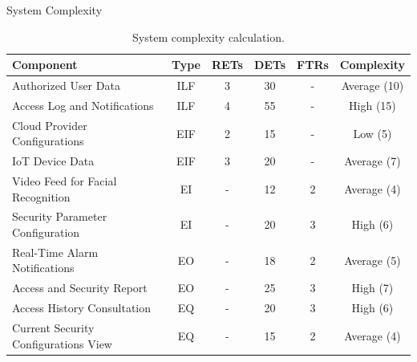 \documentclass[12pt]{beamer}
\begin{document}
\begin{frame}[allowframebreaks]{System Complexity}
\tiny

\begin{table}
    \centering
    \begin{tabular}{|l|c|c|c|c|c|}
        \hline
        \textbf{Component}
        & \textbf{Type}
        & \textbf{RETs}
        & \textbf{DETs}
        & \textbf{FTRs}
        & \textbf{Complexity} \\
        \hline
        Authorized User Data
        & ILF
        & 3
        & 30
        & -
        & Average (10) \\
        Access Log and Notifications
        & ILF
        & 4
        & 55
        & -
        & High (15) \\
        Cloud Provider Configurations
        & EIF
        & 2
        & 15
        & -
        & Low (5) \\
        IoT Device Data
        & EIF
        & 3
        & 20
        & -
        & Average (7) \\
        Video Feed for Facial Recognition
        & EI
        & -
        & 12
        & 2
        & Average (4) \\
        Security Parameter Configuration
        & EI
        & -
        & 20
        & 3
        & High (6) \\
        Real-Time Alarm Notifications
        & EO
        & -
        & 18
        & 2
        & Average (5) \\
        Access and Security Report
        & EO
        & -
        & 25
        & 3
        & High (7) \\
        Access History Consultation
        & EQ
        & -
        & 20
        & 3
        & High (6) \\
        Current Security Configurations View
        & EQ
        & -
        & 15
        & 2
        & Average (4) \\
        \hline
    \end{tabular}
    \caption{System complexity calculation.}
    \label{tab:1-1}
\end{table}
\end{frame}
\end{document}
